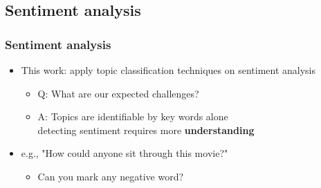 \documentclass{beamer}
\begin{document}
\subsection{Sentiment analysis}

\begin{frame}
	\frametitle{Sentiment analysis}
	\begin{itemize}
	\item This work: apply topic classification techniques on sentiment analysis
	\begin{itemize}
		\item Q: What are our expected challenges?
		\pause %
		\item A: Topics are identifiable by key words alone \\ detecting sentiment requires more \textbf{understanding}
	\end{itemize}
	\end{itemize}
	
	\pause %
	\begin{itemize}
		\item e.g., "How could anyone sit through this movie?"
		\begin{itemize}
			\item Can you mark  any negative word?
		\end{itemize}
	
	\end{itemize}
	
	

\end{frame}
\end{document}
